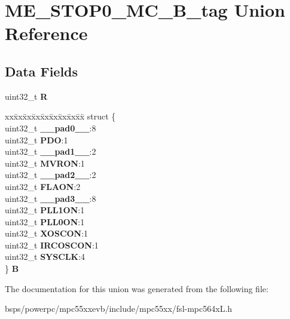 \hypertarget{unionME__STOP0__MC__32B__tag}{}\section{M\+E\+\_\+\+S\+T\+O\+P0\+\_\+\+M\+C\+\_\+B\+\_\+tag Union Reference}
\label{unionME__STOP0__MC__32B__tag}
\subsection*{Data Fields}
\begin{DoxyCompactItemize}
\item 
\mbox{\label{unionME__STOP0__MC__32B__tag_a54f4caee8ee5336022b217b1125bc6c0}} 
uint32\+\_\+t {\bfseries R}
\item 
\mbox{\label{unionME__STOP0__MC__32B__tag_abc9a0c9b9fc97c7cc5d22ac3ca8e2172}} 
\begin{tabbing}
xx\=xx\=xx\=xx\=xx\=xx\=xx\=xx\=xx\=\kill
struct \{\\
\>uint32\_t {\bfseries \_\_pad0\_\_}:8\\
\>uint32\_t {\bfseries PDO}:1\\
\>uint32\_t {\bfseries \_\_pad1\_\_}:2\\
\>uint32\_t {\bfseries MVRON}:1\\
\>uint32\_t {\bfseries \_\_pad2\_\_}:2\\
\>uint32\_t {\bfseries FLAON}:2\\
\>uint32\_t {\bfseries \_\_pad3\_\_}:8\\
\>uint32\_t {\bfseries PLL1ON}:1\\
\>uint32\_t {\bfseries PLL0ON}:1\\
\>uint32\_t {\bfseries XOSCON}:1\\
\>uint32\_t {\bfseries IRCOSCON}:1\\
\>uint32\_t {\bfseries SYSCLK}:4\\
\} {\bfseries B}\\

\end{tabbing}\end{DoxyCompactItemize}


The documentation for this union was generated from the following file\+:\begin{DoxyCompactItemize}
\item 
bsps/powerpc/mpc55xxevb/include/mpc55xx/fsl-\/mpc564x\+L.\+h\end{DoxyCompactItemize}
